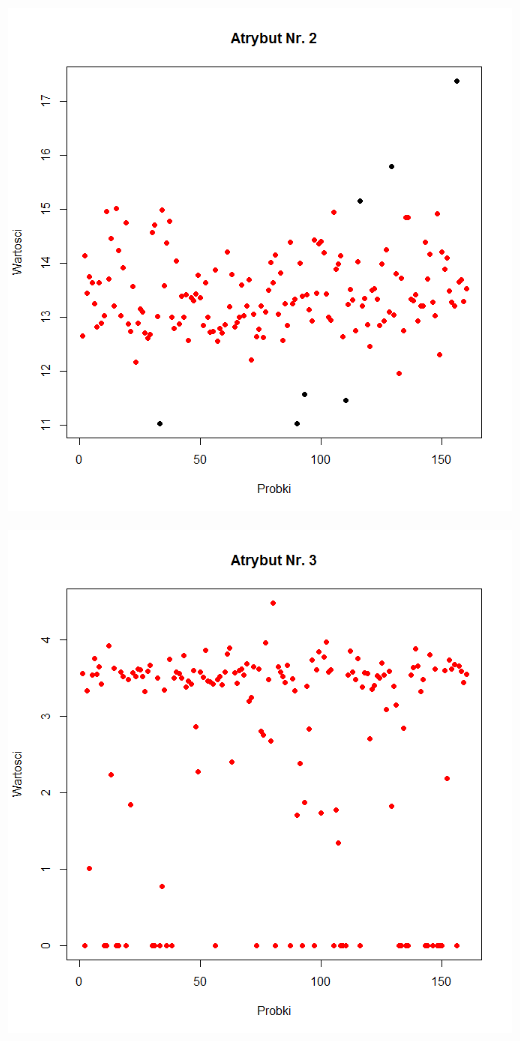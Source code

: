 \documentclass[a4paper,12pt,twoside]{article}
\begin{document}
\begin{center}
\includegraphics[width=.90\textwidth]{img/2_pkt_oddalone_2.png}
\end{center}

\begin{center}
\includegraphics[width=.90\textwidth]{img/2_pkt_oddalone_3.png}
\end{center}
\end{document}
